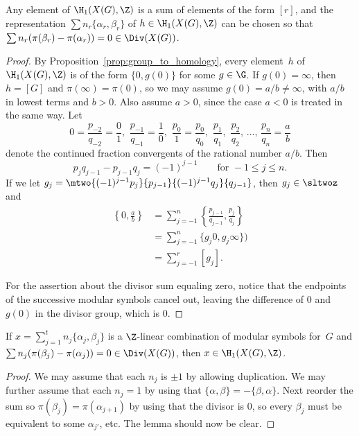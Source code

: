 \documentclass{report}
\begin{document}
\begin{proposition}\label{prop:manin_symbols_generate}
Any element of $\H_1(X(G),\Z)$ is a sum of elements of the form
$[r]$, and the representation $\sum n_r \{\alpha_r,\beta_r\}$ of
$h\in \H_1(X(G),\Z)$ can be chosen so that $\sum
n_r(\pi(\beta_r)-\pi(\alpha_r)) = 0\in\Div(X(G))$.
\end{proposition}
\begin{proof}
By Proposition~\ref{prop:group_to_homology}, every element~$h$ of
$\H_1(X(G),\Z)$ is of the form $\{0,g(0)\}$ for some $g\in\G$.  If
$g(0)=\infty$, then $h=[G]$ and $\pi(\infty)=\pi(0)$, so we may
assume $g(0)=a/b\neq \infty$, with $a/b$ in lowest terms and
$b>0$. Also assume $a>0$, since the case $a<0$ is treated in the
same way. Let
$$0=\frac{p_{-2}}{q_{-2}} = \frac{0}{1},\,\,
\frac{p_{-1}}{q_{-1}}=\frac{1}{0},\,\,
\frac{p_0}{1}=\frac{p_0}{q_0},\,\, \frac{p_1}{q_1},\,\,
\frac{p_2}{q_2},\,\ldots,\,\frac{p_n}{q_n}=\frac{a}{b}$$ denote
the continued fraction convergents of the rational number $a/b$.
Then
$$p_j q_{j-1}
  - p_{j-1} q_j = (-1)^{j-1}\qquad \text{for }-1\leq j\leq n.$$
If we let $g_j =
\mtwo{(-1)^{j-1}p_j}{p_{j-1}}{(-1)^{j-1}q_j}{q_{j-1}}$, then
$g_j\in\sltwoz$ and
\begin{align*}
  \left\{0,\frac{a}{b}\right\}
 &=\sum_{j=-1}^{n}\left\{\frac{p_{j-1}}{q_{j-1}},\frac{p_j}{q_j}\right\}\\
 &=\sum_{j=-1}^{n} \{g_j0,g_j\infty\})\\
 &=\sum_{j=-1}^{r} [g_j].
\end{align*}

For the assertion about the divisor sum equaling zero, notice that
the endpoints of the successive modular symbols cancel out,
leaving the difference of $0$ and $g(0)$ in the divisor group,
which is $0$.
\end{proof}

\begin{lemma}
If $x=\sum_{j=1}^t n_j\{\alpha_j,\beta_j\}$ is a $\Z$-linear
combination of modular symbols for~$G$ and $\sum
n_j(\pi(\beta_j)-\pi(\alpha_j))=0\in\Div(X(G))$, then
$x\in\H_1(X(G),\Z)$.
\end{lemma}
\begin{proof}
We may assume that each $n_j$ is $\pm 1$ by allowing duplication.
We may further assume that each $n_j=1$ by using that
$\{\alpha,\beta\}=-\{\beta,\alpha\}$.  Next reorder the sum so
$\pi(\beta_j)=\pi(\alpha_{j+1})$ by using that the divisor is $0$,
so every $\beta_j$ must be equivalent to some $\alpha_{j'}$, etc.
The lemma should now be clear.\end{proof}
\end{document}
